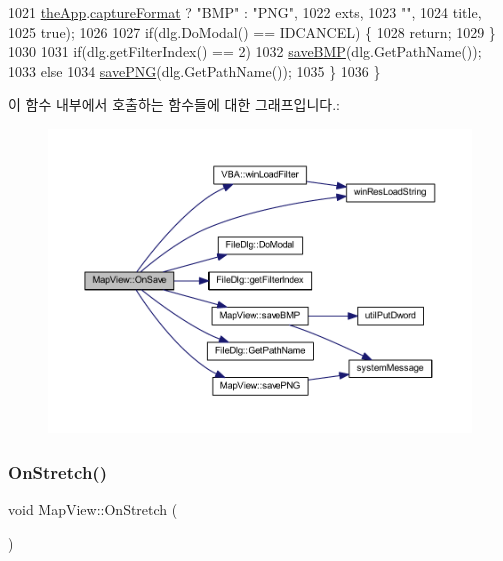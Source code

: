 \begin{DoxyCode}
1021                 \mbox{\hyperlink{_v_b_a_8cpp_a8095a9d06b37a7efe3723f3218ad8fb3}{theApp}}.\mbox{\hyperlink{class_v_b_a_a103f0b25433c57c4458a208a06799cf8}{captureFormat}} ? \textcolor{stringliteral}{"BMP"} : \textcolor{stringliteral}{"PNG"},
1022                 exts,
1023                 \textcolor{stringliteral}{""},
1024                 title,
1025                 \textcolor{keyword}{true});
1026 
1027     \textcolor{keywordflow}{if}(dlg.DoModal() == IDCANCEL) \{
1028       \textcolor{keywordflow}{return};
1029     \}
1030 
1031     \textcolor{keywordflow}{if}(dlg.getFilterIndex() == 2)
1032       \mbox{\hyperlink{class_map_view_a792d85841dc88e63ab7f31ed6de066d7}{saveBMP}}(dlg.GetPathName());
1033     \textcolor{keywordflow}{else}
1034       \mbox{\hyperlink{class_map_view_afadc38148227210fd5d8e12c50e7f22d}{savePNG}}(dlg.GetPathName());
1035   \}
1036 \}
\end{DoxyCode}
이 함수 내부에서 호출하는 함수들에 대한 그래프입니다.\+:
\nopagebreak
\begin{figure}[H]
\begin{center}
\leavevmode
\includegraphics[width=350pt]{class_map_view_a3fc9d61706da44e2fd3e8762805d9f0b_cgraph}
\end{center}
\end{figure}
\mbox{\label{class_map_view_a835d1f2f38753ace4840b69e4eaafcaf}} 
\subsubsection{\texorpdfstring{On\+Stretch()}{OnStretch()}}
{\footnotesize\ttfamily void Map\+View\+::\+On\+Stretch (\begin{DoxyParamCaption}{ }\end{DoxyParamCaption})\hspace{0.3cm}{\ttfamily [protected]}}



